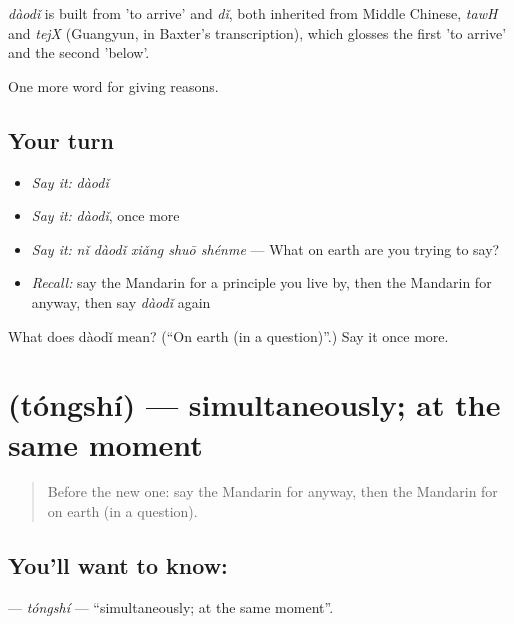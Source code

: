 \begin{cousinweb}
\emph{dàodǐ} is built from  'to arrive' and \emph{dǐ}, both inherited from Middle Chinese, \emph{tawH} and \emph{tejX} (Guangyun, in Baxter's transcription), which glosses the first 'to arrive' and the second 'below'.
\end{cousinweb}

\begin{grammarlens}[title={What you've built}]
One more word for giving reasons.
\end{grammarlens}

\subsection*{Your turn}
\begin{itemize}
\raggedright
  \item \emph{Say it:} \emph{dàodǐ}
  \item \emph{Say it:} \emph{dàodǐ}, once more
  \item \emph{Say it:} \emph{nǐ dàodǐ xiǎng shuō shénme} — What on earth are you trying to say?
  \item \emph{Recall:} say the Mandarin for a principle you live by, then the Mandarin for anyway, then say \emph{dàodǐ} again
\end{itemize}

\begin{tcolorbox}[breakable,colback=teal!4,colframe=teal!35!black,title={Before you move on}]
What does dàodǐ mean? (\textquotedblleft{}On earth (in a question)\textquotedblright{}.) Say it once more.
\end{tcolorbox}
\section[\texorpdfstring{\zh{同时} (tóngshí)}{同时 (tóngshí)}]{ (tóngshí) — simultaneously; at the same moment}

\label{lesson:ZH-C372-tongshi}



\begin{quote}
Before the new one: say the Mandarin for anyway, then the Mandarin for on earth (in a question).
\end{quote}

\subsection*{You'll want to know: }
\textbf{} — \emph{tóngshí} — \textquotedblleft{}simultaneously; at the same moment\textquotedblright{}.

